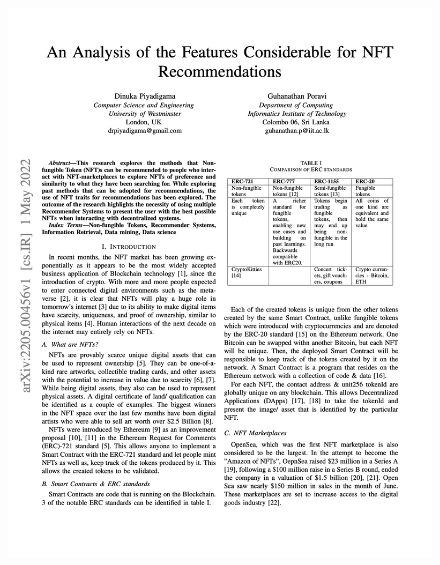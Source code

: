\begin{figure}[h!]
\centering
\includegraphics[height=0.83\textheight]{images/appendix/papers/analysis/An Analysis of the Features Considerable for NFT Recommendations.jpeg}
\end{figure}

